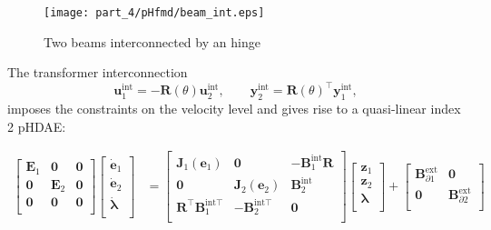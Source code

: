 \begin{figure}[t]
	\centering
	\texttt{[image: part\_4/pHfmd/beam\_int.eps]} 
	
	\caption{Two beams interconnected by an hinge }
	\label{fig:beam_int}
\end{figure}

The transformer interconnection
\begin{equation}
\label{eq:int_hinge}
\mathbf{u}_1^{\text{int}} = -\mathbf{R}(\theta) \mathbf{u}_2^{\text{int}}, \qquad
\mathbf{y}_2^{\text{int}} = \mathbf{R}(\theta)^\top \mathbf{y}_1^{\text{int}},
\end{equation}
imposes the constraints on the velocity level and gives rise to a quasi-linear index 2 pHDAE:

\begin{equation}
\label{eq:int_beams}
\begin{aligned}
\begin{bmatrix}
\mathbf{E}_1 & \mathbf{0} & \mathbf{0} \\ 
\mathbf{0} & \mathbf{E}_2 & \mathbf{0} \\
\mathbf{0} & \mathbf{0} & \mathbf{0} \\
\end{bmatrix}
\begin{bmatrix}
\dot{\mathbf{e}}_1 \\ \dot{\mathbf{e}}_2 \\ \dot{\bm{\lambda}} \\
\end{bmatrix} &= 
\begin{bmatrix}
\mathbf{J}_1(\mathbf{e}_1) & \mathbf{0} & -\mathbf{B}_1^{\text{int}} \mathbf{R} \\ 
\mathbf{0} & \mathbf{J}_2(\mathbf{e}_2) & \mathbf{B}_2^{\text{int}} \\
\mathbf{R}^\top \mathbf{B}_1^{\text{int} \top} & - \mathbf{B}_2^{\text{int} \top} & \mathbf{0} \\
\end{bmatrix}
\begin{bmatrix}
\mathbf{z}_1  \\ 
\mathbf{z}_2  \\ 
\bm{\lambda} \\
\end{bmatrix}+ 
\begin{bmatrix}
\mathbf{B}_{\partial 1}^{\text{ext}} & \mathbf{0} \\
\mathbf{0} & \mathbf{B}_{\partial 2}^{\text{ext}} \\

\end{bmatrix}
\end{aligned}
\end{equation}

